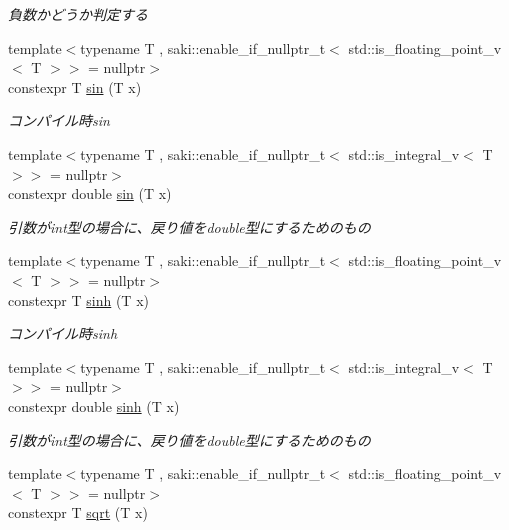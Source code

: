 \begin{DoxyCompactItemize}
\begin{DoxyCompactList}\small\item\em 負数かどうか判定する \end{DoxyCompactList}\item 
{\footnotesize template$<$typename T , saki\+::enable\+\_\+if\+\_\+nullptr\+\_\+t$<$ std\+::is\+\_\+floating\+\_\+point\+\_\+v$<$ T $>$$>$  = nullptr$>$ }\\constexpr T \mbox{\hyperlink{namespacesaki_a743f7284cdebb6406db9b37e42bcd730}{sin}} (T x)
\begin{DoxyCompactList}\small\item\em コンパイル時sin \end{DoxyCompactList}\item 
{\footnotesize template$<$typename T , saki\+::enable\+\_\+if\+\_\+nullptr\+\_\+t$<$ std\+::is\+\_\+integral\+\_\+v$<$ T $>$$>$  = nullptr$>$ }\\constexpr double \mbox{\hyperlink{namespacesaki_a9fd77d1e52189e28f4a5d069891501cf}{sin}} (T x)
\begin{DoxyCompactList}\small\item\em 引数がint型の場合に、戻り値をdouble型にするためのもの \end{DoxyCompactList}\item 
{\footnotesize template$<$typename T , saki\+::enable\+\_\+if\+\_\+nullptr\+\_\+t$<$ std\+::is\+\_\+floating\+\_\+point\+\_\+v$<$ T $>$$>$  = nullptr$>$ }\\constexpr T \mbox{\hyperlink{namespacesaki_abe1ef6db83d59a5eb2daac9bff09d312}{sinh}} (T x)
\begin{DoxyCompactList}\small\item\em コンパイル時sinh \end{DoxyCompactList}\item 
{\footnotesize template$<$typename T , saki\+::enable\+\_\+if\+\_\+nullptr\+\_\+t$<$ std\+::is\+\_\+integral\+\_\+v$<$ T $>$$>$  = nullptr$>$ }\\constexpr double \mbox{\hyperlink{namespacesaki_a8199390b7650fdebe491aaeb4c3a44c3}{sinh}} (T x)
\begin{DoxyCompactList}\small\item\em 引数がint型の場合に、戻り値をdouble型にするためのもの \end{DoxyCompactList}\item 
{\footnotesize template$<$typename T , saki\+::enable\+\_\+if\+\_\+nullptr\+\_\+t$<$ std\+::is\+\_\+floating\+\_\+point\+\_\+v$<$ T $>$$>$  = nullptr$>$ }\\constexpr T \mbox{\hyperlink{namespacesaki_a5c2f6c98a144d6ba6683c86c865fd595}{sqrt}} (T x)

\end{DoxyCompactItemize}
